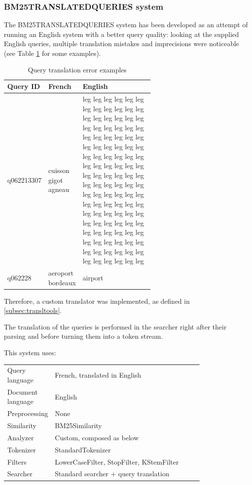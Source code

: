 \subsubsection{BM25TRANSLATEDQUERIES system}
\label{subsub:BM25TRANSLATEDQUERIES}
The BM25TRANSLATEDQUERIES system has been developed as an attempt of running an English system with a better query quality: looking at the supplied English queries, multiple translation mistakes and imprecisions were noticeable (see Table \ref{tab:qtransl} for some examples).
\begin{table}[h!]
  \caption{Query translation error examples}
  \label{tab:qtransl}
  \centering
  \begin{tabular}{|l|l|p{0.6\linewidth}|}
    \toprule
    Query ID&French&English\\
    \midrule
    q062213307 & cuisson gigot agneau & leg leg leg leg leg leg leg leg leg leg leg leg leg leg leg leg leg leg leg leg leg leg leg leg leg leg leg leg leg leg leg leg leg leg leg leg leg leg leg leg leg leg leg leg leg leg leg leg leg leg leg leg leg leg leg leg leg leg leg leg leg leg leg leg leg leg leg leg leg leg leg leg leg leg leg leg leg leg leg leg leg leg leg leg leg leg leg leg leg leg leg leg leg leg leg leg leg leg leg leg leg leg leg leg leg leg leg leg\\
q062228 & aeroport bordeaux & airport\\
  \bottomrule
\end{tabular}
\end{table}
Therefore, a custom translator was implemented, as defined in \ref{subsec:transltools}.
\par
The translation of the queries is performed in the searcher right after their parsing and before turning them into a token stream.
\par
This system uses:
\begin{table}[h!]
    \centering
    \begin{tabular}{l p{0.8\linewidth}}
    Query language & French, translated in English\\
    Document language & English\\
    Preprocessing & None\\
    Similarity & BM25Similarity\\
    Analyzer & Custom, composed as below\\
    Tokenizer & StandardTokenizer\\
    Filters & LowerCaseFilter, StopFilter, KStemFilter\\
    Searcher & Standard searcher + query translation
    \end{tabular}
\end{table}
